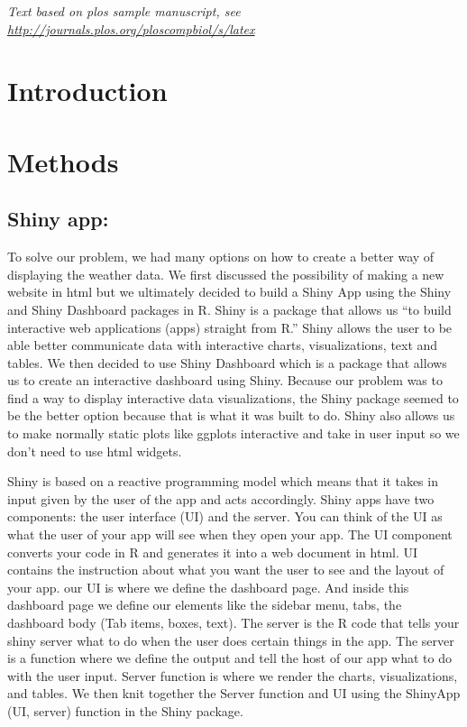 \documentclass[10pt,letterpaper]{article}
\begin{document}
\linenumbers

\emph{Text based on plos sample manuscript, see
\url{http://journals.plos.org/ploscompbiol/s/latex}}

\section{Introduction}\label{introduction}

\section{Methods}\label{methods}

\subsection{Shiny app:}\label{shiny-app}

To solve our problem, we had many options on how to create a better way
of displaying the weather data. We first discussed the possibility of
making a new website in html but we ultimately decided to build a Shiny
App using the Shiny and Shiny Dashboard packages in R. Shiny is a
package that allows us ``to build interactive web applications (apps)
straight from R.'' Shiny allows the user to be able better communicate
data with interactive charts, visualizations, text and tables. We then
decided to use Shiny Dashboard which is a package that allows us to
create an interactive dashboard using Shiny. Because our problem was to
find a way to display interactive data visualizations, the Shiny package
seemed to be the better option because that is what it was built to do.
Shiny also allows us to make normally static plots like ggplots
interactive and take in user input so we don't need to use html widgets.

Shiny is based on a reactive programming model which means that it takes
in input given by the user of the app and acts accordingly. Shiny apps
have two components: the user interface (UI) and the server. You can
think of the UI as what the user of your app will see when they open
your app. The UI component converts your code in R and generates it into
a web document in html. UI contains the instruction about what you want
the user to see and the layout of your app. our UI is where we define
the dashboard page. And inside this dashboard page we define our
elements like the sidebar menu, tabs, the dashboard body (Tab items,
boxes, text). The server is the R code that tells your shiny server what
to do when the user does certain things in the app. The server is a
function where we define the output and tell the host of our app what to
do with the user input. Server function is where we render the charts,
visualizations, and tables. We then knit together the Server function
and UI using the ShinyApp (UI, server) function in the Shiny package.
\end{document}
